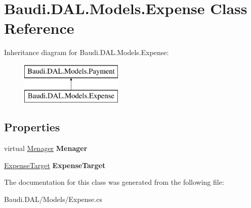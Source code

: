 \hypertarget{class_baudi_1_1_d_a_l_1_1_models_1_1_expense}{}\section{Baudi.\+D\+A\+L.\+Models.\+Expense Class Reference}
\label{class_baudi_1_1_d_a_l_1_1_models_1_1_expense}
Inheritance diagram for Baudi.\+D\+A\+L.\+Models.\+Expense\+:\begin{figure}[H]
\begin{center}
\leavevmode
\includegraphics[height=2.000000cm]{class_baudi_1_1_d_a_l_1_1_models_1_1_expense}
\end{center}
\end{figure}
\subsection*{Properties}
\begin{DoxyCompactItemize}
\item 
\hypertarget{class_baudi_1_1_d_a_l_1_1_models_1_1_expense_a825fdec6e7ba5865e8ceae4dcd9e489d}{}virtual \hyperlink{class_baudi_1_1_d_a_l_1_1_models_1_1_menager}{Menager} {\bfseries Menager}\label{class_baudi_1_1_d_a_l_1_1_models_1_1_expense_a825fdec6e7ba5865e8ceae4dcd9e489d}

\item 
\hypertarget{class_baudi_1_1_d_a_l_1_1_models_1_1_expense_af025d88429cfb0e4266e23bcd6a4de26}{}\hyperlink{class_baudi_1_1_d_a_l_1_1_models_1_1_expense_target}{Expense\+Target} {\bfseries Expense\+Target}\label{class_baudi_1_1_d_a_l_1_1_models_1_1_expense_af025d88429cfb0e4266e23bcd6a4de26}

\end{DoxyCompactItemize}


The documentation for this class was generated from the following file\+:\begin{DoxyCompactItemize}
\item 
Baudi.\+D\+A\+L/\+Models/Expense.\+cs\end{DoxyCompactItemize}
